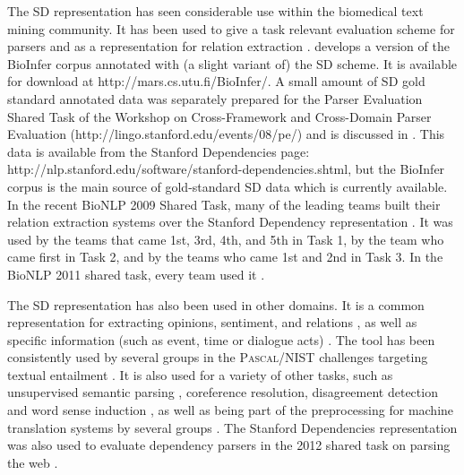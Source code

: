 \documentclass[11pt,letterpaper]{article}
\def\url#1{\textsf{#1}}
\begin{document}
\begin{sloppypar}
The SD representation has seen considerable use within the biomedical text
mining community.  It has been used to give a task relevant evaluation
scheme for parsers \citep{Clegg07,Pyysalo07} and as a representation
for relation extraction
\citep{Erkan07,Greenwood07,Urbain07,Fundel07,Clegg08,Pyysalo08,giles08large,ozgur08identifying,ramakrishnan08discovery,bjorne08how,Yarten10,Bjorne2011,Pyysalo11,Landeghem12}.
\citet{Pyysalo07} develops a version of the BioInfer corpus annotated
with (a slight variant of) the SD scheme.  It is available for
download at \url{http://mars.cs.utu.fi/BioInfer/}.
A small amount of SD gold standard annotated data was separately prepared for the
Parser Evaluation Shared Task of the Workshop on Cross-Framework and
Cross-Domain Parser Evaluation
(\url{http://lingo.stanford.edu/events/08/pe/}) and is discussed in
\citep{demarneffe08stanford}. This data is available from the Stanford
Dependencies page: \url{http://nlp.stanford.edu/software\discretionary{}{}{}/stanford-dependencies.shtml},
but the BioInfer corpus is the main source of gold-standard SD data which is currently available.
In the recent BioNLP 2009 Shared Task, many of the leading teams built their relation extraction systems over the Stanford Dependency representation \citep{kim09overview}.  It was used by the teams that came 1st, 3rd, 4th, and 5th in Task 1, by the team who came first in Task 2, and by the teams who came 1st and 2nd in Task 3. In the BioNLP 2011 shared task, every team used it \citep{BioNLP11}.
\end{sloppypar}

The SD representation has also been used in other domains.  It is a common representation for
extracting opinions, sentiment, and relations
\citep{Zhuang06cikm,Meena07sentiment,Banko07,Zouaq06tai,Zouaq07tel,chaumartin07knowledge,kessler08icwsm,Haghighi10,Hassan10,Joshi2010,Wu2010,Zouaq10}, as well as specific information (such as event, time or dialogue acts) \citep{Chambers11,McClosky12,Kluwer10}. The tool has been consistently used by several groups in the \textsc{Pascal}/NIST challenges targeting textual entailment \citep{adams-EtAl:2007:WTEP,blake:2007:WTEP,chambers-EtAl:2007:WTEP,harmeling:2007:WTEP,wang-neumann:2007:WTEP,Malakasiotis09,Mehdad09,Shivare2010,Glinos2010,Kouylekov2010,Pakray2011a}. It is also used for a variety of other tasks, such as unsupervised semantic parsing \citep{poon09unsupervised}, coreference resolution, disagreement detection and word sense induction \citep{Chen12,Abbott11,Lau12}, as well as being part of the preprocessing for machine translation systems by several groups \citep{xu09using,genzel10automatically,singh10statistical}.
The Stanford Dependencies representation
was also used to evaluate dependency parsers in the 2012 shared task on parsing the web \citep{Petrov12}.
\end{document}
